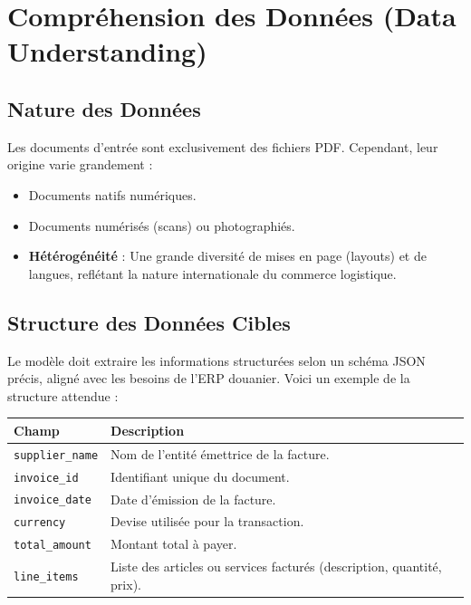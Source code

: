 \documentclass[
  letterpaper,
  DIV=11,
  numbers=noendperiod]{scrartcl}
\providecommand{\tightlist}{%
  \setlength{\itemsep}{0pt}\setlength{\parskip}{0pt}}
\begin{document}
\section{Compréhension des Données (Data
Understanding)}\label{compruxe9hension-des-donnuxe9es-data-understanding}

\subsection{Nature des Données}\label{nature-des-donnuxe9es}

Les documents d'entrée sont exclusivement des fichiers PDF. Cependant,
leur origine varie grandement :

\begin{itemize}
\tightlist
\item
  Documents natifs numériques.
\item
  Documents numérisés (scans) ou photographiés.
\item
  \textbf{Hétérogénéité} : Une grande diversité de mises en page
  (layouts) et de langues, reflétant la nature internationale du
  commerce logistique.
\end{itemize}

\subsection{Structure des Données
Cibles}\label{structure-des-donnuxe9es-cibles}

Le modèle doit extraire les informations structurées selon un schéma
JSON précis, aligné avec les besoins de l'ERP douanier. Voici un exemple
de la structure attendue :

\begin{longtable}[]{@{}
  >{\raggedright\arraybackslash}p{}
  >{\raggedright\arraybackslash}p{}@{}}
\toprule\noalign{}
\begin{minipage}[b]{\linewidth}\raggedright
Champ
\end{minipage} & \begin{minipage}[b]{\linewidth}\raggedright
Description
\end{minipage} \\
\midrule\noalign{}
\endhead
\bottomrule\noalign{}
\endlastfoot
\texttt{supplier\_name} & Nom de l'entité émettrice de la facture. \\
\texttt{invoice\_id} & Identifiant unique du document. \\
\texttt{invoice\_date} & Date d'émission de la facture. \\
\texttt{currency} & Devise utilisée pour la transaction. \\
\texttt{total\_amount} & Montant total à payer. \\
\texttt{line\_items} & Liste des articles ou services facturés
(description, quantité, prix). \\
\end{longtable}
\end{document}
